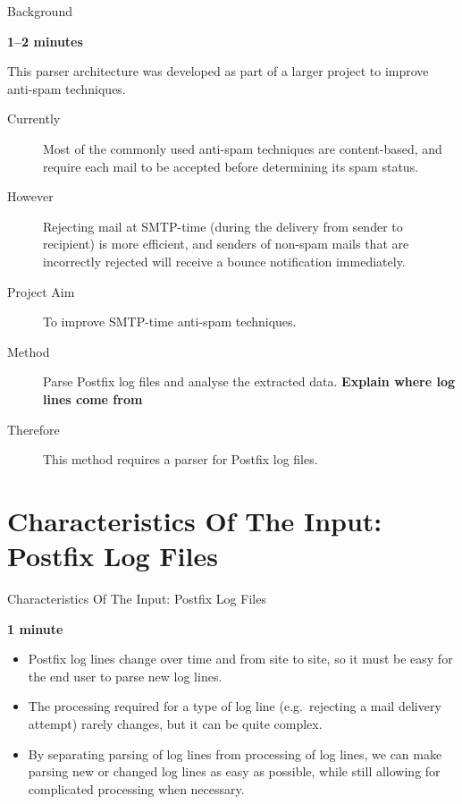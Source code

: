 \documentclass{beamer}
\newcommand{\timingnote}[1]{%
    \textbf{#1}%
}
\begin{document}
\begin{frame}{Background}

    \timingnote{1--2 minutes}

    This parser architecture was developed as part of a larger project to
    improve anti-spam techniques.

    \begin{description}

        \item [Currently] Most of the commonly used anti-spam techniques
            are content-based, and require each mail to be accepted before
            determining its spam status.

        \item [However] Rejecting mail at SMTP-time (during the delivery
            from sender to recipient) is more efficient, and senders of
            non-spam mails that are incorrectly rejected will receive a
            bounce notification immediately.

        \item [Project Aim] To improve SMTP-time anti-spam techniques.

        \item [Method] Parse Postfix log files and analyse the
            extracted data.  \timingnote{Explain where log lines come from}

        \item [Therefore] This method requires a parser for Postfix log
            files.

    \end{description}

\end{frame}

\section{Characteristics Of The Input: Postfix Log Files}

\begin{frame}{Characteristics Of The Input: Postfix Log Files}

    \timingnote{1 minute}

    \begin{itemize}

        \item Postfix log lines change over time and from site to site, so
            it must be easy for the end user to parse new log lines.

        \item The processing required for a type of log line (e.g.\
            rejecting a mail delivery attempt) rarely changes, but it can
            be quite complex.

        \item By separating parsing of log lines from processing of log
            lines, we can make parsing new or changed log lines as easy as
            possible, while still allowing for complicated processing when
            necessary.

    \end{itemize}

\end{frame}
\end{document}
